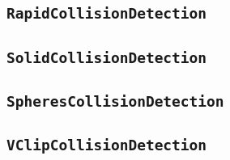 \subsection{\texttt{RapidCollisionDetection}}

\subsection{\texttt{SolidCollisionDetection}}

\subsection{\texttt{SpheresCollisionDetection}}

\subsection{\texttt{VClipCollisionDetection}}

